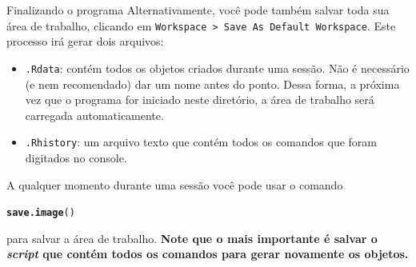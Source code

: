 \documentclass[10pt,handout]{beamer}\usepackage[]{graphicx}\usepackage[]{color}
\makeatletter
\newcommand{\hlstd}[1]{\textcolor[rgb]{0.345,0.345,0.345}{#1}}%
\newcommand{\hlkwd}[1]{\textcolor[rgb]{0.737,0.353,0.396}{\textbf{#1}}}%
\newenvironment{kframe}{%
 \def\at@end@of@kframe{}%
 \ifinner\ifhmode%
  \def\at@end@of@kframe{\end{minipage}}%
  \begin{minipage}{\columnwidth}%
 \fi\fi%
 \def\FrameCommand##1{\hskip\@totalleftmargin \hskip-\fboxsep
 \colorbox{shadecolor}{##1}\hskip-\fboxsep
     \hskip-\linewidth \hskip-\@totalleftmargin \hskip\columnwidth}%
 \MakeFramed {\advance\hsize-\width
   \@totalleftmargin\z@ \linewidth\hsize
   \@setminipage}}%
 {\par\unskip\endMakeFramed%
 \at@end@of@kframe}
\newenvironment{knitrout}{}{} %
\makeatother
\begin{document}
\begin{frame}[fragile]{Finalizando o programa}
Alternativamente, você pode também salvar toda sua área de trabalho,
clicando em \texttt{Workspace > Save As Default Workspace}. Este
processo irá gerar dois arquivos:
\begin{itemize}
\item \texttt{.Rdata}: contém todos os objetos criados durante uma
  sessão. Não é necessário (e nem recomendado) dar um nome antes do
  ponto. Dessa forma, a próxima vez que o programa for iniciado neste
  diretório, a área de trabalho será carregada automaticamente.
\item \texttt{.Rhistory}: um arquivo texto que contém todos os comandos
  que foram digitados no console.
\end{itemize}
A qualquer momento durante uma sessão você pode usar o comando
\begin{knitrout}\small
{}\color{fgcolor}\begin{kframe}
\begin{alltt}
\hlkwd{save.image}\hlstd{()}
\end{alltt}
\end{kframe}
\end{knitrout}
para salvar a área de trabalho. \textbf{Note que o mais importante é salvar o
\emph{script} que contém todos os comandos para gerar novamente os
objetos.}
\end{frame}
\end{document}
